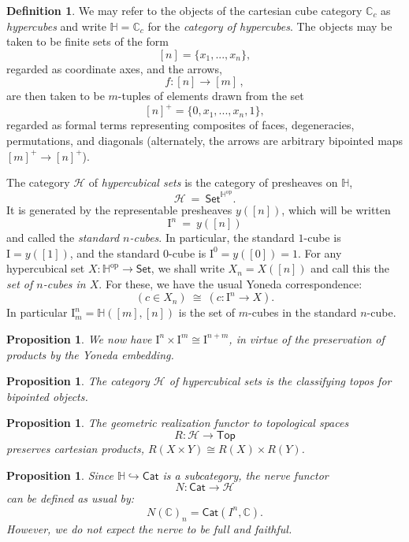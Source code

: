 \documentclass[11pt]{article}
\newcommand{\C}{\ensuremath{\mathbb{C}}}
\newcommand{\psh}[1]{\ensuremath{\mathsf{Set}^{#1^{\mathrm{op}}}}}
\newcommand{\Set}{\ensuremath{\mathsf{Set}}}
\newcommand{\Cat}{\ensuremath{\mathsf{Cat}}}
\newcommand{\hook}{\ensuremath{\hookrightarrow}}
\newcommand{\I}{\ensuremath{\mathrm{I}}}
\renewcommand{\H}{\ensuremath{\mathbb{H}}}
\newcommand{\HH}{\ensuremath{\mathcal{H}}}
\newtheorem{proposition}[theorem]{Proposition}
\theoremstyle{remark}
\theoremstyle{definition}
\newtheorem{definition}[theorem]{Definition}
\begin{document}
\begin{definition}
We may refer to the objects of the cartesian cube category $\C_c $ as \emph{hypercubes} and write $\H = \C_c$ for the \emph{category of hypercubes}.  The objects may be taken to be finite sets of the form $$[n] = \{x_1, ..., x_n\},$$ regarded as coordinate axes, and the arrows,
\[
f : [n] \to [m]\,,
\]
are then taken to be $m$-tuples of elements drawn from the set $$[n]^+ = \{0, x_1, ..., x_n, 1\},$$ regarded as formal terms representing composites of faces, degeneracies, permutations, and diagonals (alternately, the arrows are arbitrary bipointed maps $[m]^+\to [n]^+$).

The category $\HH$ of \emph{hypercubical sets} is  the category of presheaves on $\H$,
\[
\HH\ =\ \psh{\H}.
\]
It is generated by the representable presheaves $y([n])$, which will be written
$$\I^n\ =\ y([n])$$ 
and called the \emph{standard $n$-cubes}.  In particular, the standard $1$-cube is $\I = y([1])$, and the standard $0$-cube is $\I^0 = y([0])=1$.  For any hypercubical set $X: \H^\mathrm{op} \to \Set$, we shall write $X_n = X([n])$ and call this the \emph{set of $n$-cubes in $X$}.  For these, we have the usual Yoneda correspondence:
\[
(c \in X_n ) \ \cong\ (c : \I^n \to X).
\]
In particular $\I^n_m = \H([m],[n])$ is the set of $m$-cubes in the standard $n$-cube.
\end{definition}

\begin{proposition}
We now have $\I^n \times \I^m \cong \I^{n+m}$, in virtue of the preservation of products by the Yoneda embedding.
\end{proposition}


\begin{proposition}
The category $\HH$ of hypercubical sets is the classifying topos for bipointed objects.
\end{proposition}

\begin{proposition}
The geometric realization functor to topological spaces 
$$R: \HH \to \mathsf{Top}$$
preserves cartesian products, $R(X\times Y) \cong R(X)\times R(Y)$.
\end{proposition}

\begin{proposition}
Since $\H \hook  \Cat$ is a subcategory, the \emph{nerve} functor $$N : \Cat \to \HH$$ can be defined as usual by:
\[
N(\C)_n = \Cat(I^n, \C).
\]
However, we do not expect the nerve to be full and faithful.
\end{proposition}
\end{document}
